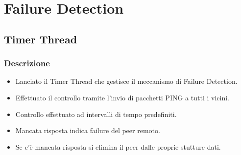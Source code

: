 \documentclass[a4paper,italian,12pt]{beamer}
\begin{document}
	\section{Failure Detection}
		\subsection{Timer Thread}
			\begin{frame}
				\frametitle{Descrizione}
				\begin{itemize}
					\item Lanciato il Timer Thread che gestisce il meccanismo di Failure Detection.
					\item Effettuato il controllo tramite l'invio di pacchetti PING a tutti i vicini.
					\item Controllo effettuato ad intervalli di tempo predefiniti.
					\item Mancata risposta indica failure del peer remoto.
					\item Se c'è mancata risposta si elimina il peer dalle proprie stutture dati.
				\end{itemize}
			\end{frame}
	
\end{document}
